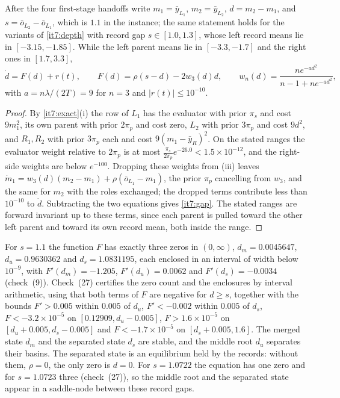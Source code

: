 \documentclass[11pt,letterpaper]{report}
\begin{document}
After the four first-stage handoffs write $m_1=\bar y_{L_1}$, $m_2=\bar y_{L_2}$, $d=m_2-m_1$, and $s=\bar o_{L_2}-\bar o_{L_1}$, which is $1.1$ in the instance; the same statement holds for the variants of \cref{it7:depth} with record gap $s\in[1.0,1.3]$, whose left record means lie in $[-3.15,-1.85]$. While the left parent means lie in $[-3.3,-1.7]$ and the right ones in $[1.7,3.3]$,
\begin{equation}
\dot d=F(d)+r(t),\qquad F(d)=\rho(s-d)-2w_3(d)d,\qquad w_n(d)=\frac{ne^{-ad^2}}{n-1+ne^{-ad^2}},
\label{it7:gap}
\end{equation}
with $a=n\lambda/(2T)=9$ for $n=3$ and $|r(t)|\le10^{-10}$.
\begin{proof}
By \cref{it7:exact}(i) the row of $L_1$ has the evaluator with prior $\pi_s$ and cost $9m_1^2$, its own parent with prior $2\pi_p$ and cost zero, $L_2$ with prior $3\pi_p$ and cost $9d^2$, and $R_1,R_2$ with prior $3\pi_p$ each and cost $9(m_1-\bar y_R)^2$. On the stated ranges the evaluator weight relative to $2\pi_p$ is at most $\frac{\pi_s}{2\pi_p}e^{-26.0}<1.5\times10^{-12}$, and the right-side weights are below $e^{-100}$. Dropping these weights from (iii) leaves $\dot m_1=w_3(d)(m_2-m_1)+\rho(\bar o_{L_1}-m_1)$, the prior $\pi_p$ cancelling from $w_3$, and the same for $m_2$ with the roles exchanged; the dropped terms contribute less than $10^{-10}$ to $\dot d$. Subtracting the two equations gives \cref{it7:gap}. The stated ranges are forward invariant up to these terms, since each parent is pulled toward the other left parent and toward its own record mean, both inside the range.
\end{proof}

For $s=1.1$ the function $F$ has exactly three zeros in $(0,\infty)$, $d_m=0.0045647$, $d_u=0.9630362$ and $d_s=1.0831195$, each enclosed in an interval of width below $10^{-9}$, with $F'(d_m)=-1.205$, $F'(d_u)=0.0062$ and $F'(d_s)=-0.0034$ (check~(9)). Check~(27) certifies the zero count and the enclosures by interval arithmetic, using that both terms of $F$ are negative for $d\ge s$, together with the bounds $F'>0.005$ within $0.005$ of $d_u$, $F'<-0.002$ within $0.005$ of $d_s$, $F<-3.2\times10^{-5}$ on $[0.12909,d_u-0.005]$, $F>1.6\times10^{-5}$ on $[d_u+0.005,d_s-0.005]$ and $F<-1.7\times10^{-5}$ on $[d_s+0.005,1.6]$. The merged state $d_m$ and the separated state $d_s$ are stable, and the middle root $d_u$ separates their basins. The separated state is an equilibrium held by the records: without them, $\rho=0$, the only zero is $d=0$. For $s=1.0722$ the equation has one zero and for $s=1.0723$ three (check~(27)), so the middle root and the separated state appear in a saddle-node between these record gaps.
\end{document}
